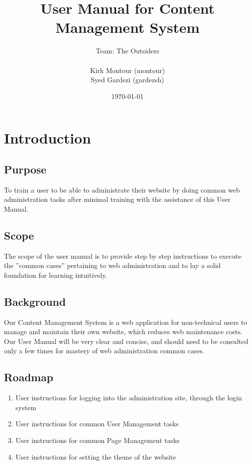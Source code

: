 \documentclass[12pt]{article}
\begin{document}
\title{User Manual for Content Management System} 
\author{Team: The Outsiders\\ \\ Kirk Montour (montour)\\ Syed Gardezi (gardezsh)}
\date{\today}
  
\maketitle

\pagebreak

\tableofcontents

\pagebreak

\section{Introduction}

\subsection{Purpose}
To train a user to be able to administrate their website by doing common web administration tasks after minimal training with the assistance of this User Manual.

\subsection{Scope}
The scope of the user manual is to provide step by step instructions to execute the ''common cases'' pertaining to web administration and to lay a solid foundation for learning intuitively.

\subsection{Background}
Our Content Management System is a web application for non-technical users to manage and maintain their own website, which reduces web maintenance costs. Our User Manual will be very clear and concise, and should need to be consulted only a few times for mastery of web administration common cases.

\subsection{Roadmap}

\begin{enumerate}
  \item User instructions for logging into the administration site, through the login system
  \item User instructions for common User Management tasks
  \item User instructions for common Page Management tasks
  \item User instructions for setting the theme of the website
\end{enumerate}
\end{document}
